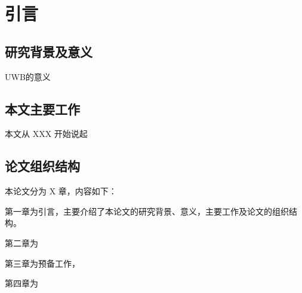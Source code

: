 \section{引言}

\subsection{研究背景及意义}

UWB的意义

\subsection{本文主要工作}

本文从 XXX 开始说起

\subsection{论文组织结构}
 
 本论文分为 X 章，内容如下：

 第一章为引言，主要介绍了本论文的研究背景、意义，主要工作及论文的组织结构。

 第二章为

 第三章为预备工作，

 第四章为

 

